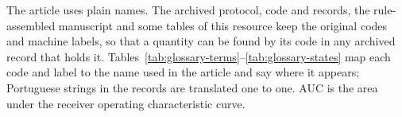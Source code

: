 
The article uses plain names. The archived protocol, code and records, the rule-assembled manuscript and some tables of this resource keep the original codes and machine labels, so that a quantity can be found by its code in any archived record that holds it. Tables~\ref{tab:glossary-terms}--\ref{tab:glossary-states} map each code and label to the name used in the article and say where it appears; Portuguese strings in the records are translated one to one. AUC is the area under the receiver operating characteristic curve.


